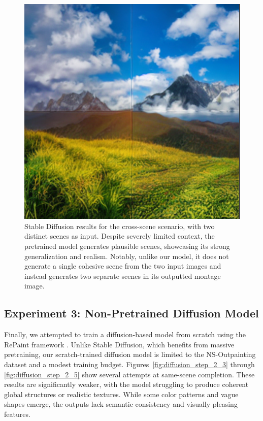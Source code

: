 \documentclass[sigconf]{acmart}
\begin{document}
\begin{figure}[h!]
    \centering
    \includegraphics[width=\linewidth]{stable_diffusion_step_5}
    \caption{Stable Diffusion results for the cross-scene scenario, with two distinct scenes as input. Despite severely limited context, the pretrained model generates plausible scenes, showcasing its strong generalization and realism. Notably, unlike our model, it does not generate a single cohesive scene from the two input images and instead generates two separate scenes in its outputted montage image.}
    \label{fig:stable_diffusion_step_5}
\end{figure}

\subsection*{Experiment 3: Non-Pretrained Diffusion Model}

Finally, we attempted to train a diffusion-based model from scratch using the RePaint framework \cite{Lugmayr2022}. Unlike Stable Diffusion, which benefits from massive pretraining, our scratch-trained diffusion model is limited to the NS-Outpainting dataset and a modest training budget. Figures~\ref{fig:diffusion_step_2_3} through \ref{fig:diffusion_step_2_5} show several attempts at same-scene completion. These results are significantly weaker, with the model struggling to produce coherent global structures or realistic textures. While some color patterns and vague shapes emerge, the outputs lack semantic consistency and visually pleasing features.
\end{document}
